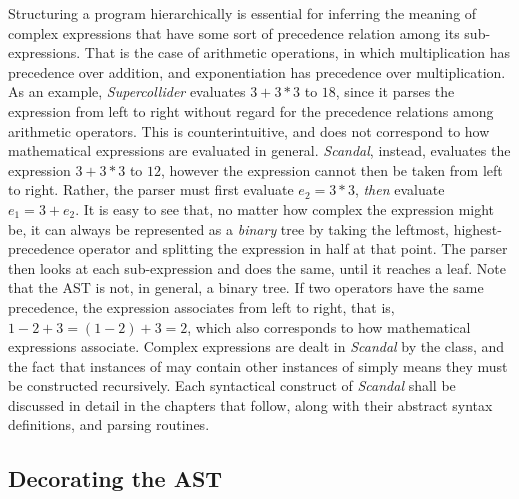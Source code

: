 Structuring a program hierarchically is essential for inferring the meaning of complex expressions that have some sort of precedence relation among its sub-expressions. That is the case of arithmetic operations, in which multiplication has precedence over addition, and exponentiation has precedence over multiplication. As an example, \emph{Supercollider} evaluates $3 + 3 * 3$ to $18$, since it parses the expression from left to right without regard for the precedence relations among arithmetic operators. This is counterintuitive, and does not correspond to how mathematical expressions are evaluated in general. \emph{Scandal}, instead, evaluates the expression $3 + 3 * 3$ to $12$, however the expression cannot then be taken from left to right. Rather, the parser must first evaluate $e_2 = 3 * 3$, \emph{then} evaluate $e_1 = 3 + e_2$. It is easy to see that, no matter how complex the expression might be, it can always be represented as a \emph{binary} tree by taking the leftmost, highest-precedence operator and splitting the expression in half at that point. The parser then looks at each sub-expression and does the same, until it reaches a leaf. Note that the AST is not, in general, a binary tree. If two operators have the same precedence, the expression associates from left to right, that is, $1 - 2 + 3 = (1 - 2) + 3 = 2$, which also corresponds to how mathematical expressions associate. Complex expressions are dealt in \emph{Scandal} by the  class, and the fact that instances of  may contain other instances of  simply means they must be constructed recursively. Each syntactical construct of \emph{Scandal} shall be discussed in detail in the chapters that follow, along with their abstract syntax definitions, and parsing routines.

\subsection{Decorating the AST}


